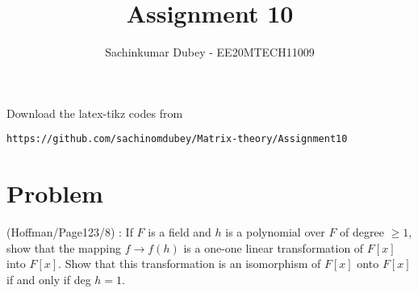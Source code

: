 \documentclass[journal,12pt,twocolumn]{IEEEtran}
\begin{document}
\def\putbox#1#2#3{\makebox[0in][l]{\makebox[#1][l]{}\raisebox{\baselineskip}[0in][0in]{\raisebox{#2}[0in][0in]{#3}}}}
     \def\rightbox#1{\makebox[0in][r]{#1}}
     \def\centbox#1{\makebox[0in]{#1}}
     \def\topbox#1{\raisebox{-\baselineskip}[0in][0in]{#1}}
     \def\midbox#1{\raisebox{-0.5\baselineskip}[0in][0in]{#1}}
\vspace{3cm}
\title{Assignment 10}
\author{Sachinkumar Dubey - EE20MTECH11009}
\maketitle
\newpage
\bigskip
\renewcommand{\thefigure}{\theenumi}
\renewcommand{\thetable}{\theenumi}
%
Download the latex-tikz codes from 
%
\begin{lstlisting}
https://github.com/sachinomdubey/Matrix-theory/Assignment10
\end{lstlisting}
\section{Problem}
(Hoffman/Page123/8) : 
%
If $F$ is a field and $h$ is a polynomial over $F$ of degree $\geq 1$,  show that the mapping $f \rightarrow f(h)$ is a one-one linear transformation of $F[x]$ into $F[x]$. Show that this transformation is an isomorphism of $F[x]$ onto $F[x]$ if and only if deg $h = 1$. 
\end{document}
